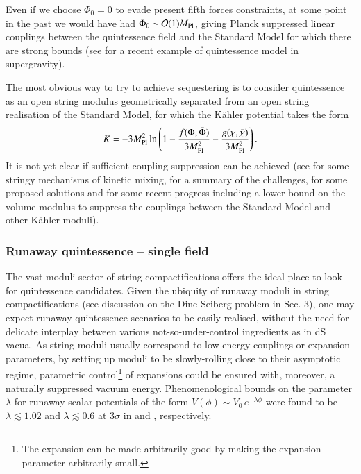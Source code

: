 \begin{itemize}
Even if we choose $\Phi_0=0$ to evade present fifth forces constraints, at some point in the past we would have had $\Phi_0 \sim \mathcal{O}(1)M_{\rm Pl}$, giving Planck suppressed linear couplings between the quintessence field and the Standard Model for which there are strong bounds (see \cite{Chiang:2018jdg} for a recent example of quintessence model in supergravity). 

The most obvious way to try to achieve sequestering is to consider quintessence as an open string modulus geometrically separated from an open string realisation of the Standard Model, for which the K\"ahler potential takes the form 
\begin{equation}
K = -3M_{\rm Pl}^2 \ln \left( 1 - \frac{f(\Phi, \bar\Phi)}{3 M_{\rm Pl}^2} - \frac{g(\chi, \bar\chi)}{3M_{\rm Pl}^2} \right).
\end{equation}
It is not yet clear if sufficient coupling suppression can be achieved (see \cite{Conlon:2007gk, Cicoli:2010ha, Cicoli:2012cy, Abel:2008ai, Burgess:2008ri, Goodsell:2009xc, Cicoli:2011yh, Gan:2023wnp} for some stringy mechanisms of kinetic mixing, \cite{Berg:2010ha} for a summary of the challenges, \cite{Aparicio:2014wxa} for some proposed solutions and \cite{Acharya:2018deu} for some recent progress including a lower bound on the volume modulus to suppress the couplings between the Standard Model and other K\"ahler moduli).  
\end{itemize}
     



\subsubsection{Runaway quintessence -- single field} 
\label{S:singlefieldq}

The vast moduli sector of string compactifications offers the ideal place to look for quintessence candidates. Given the ubiquity of runaway moduli in string compactifications (see discussion on the Dine-Seiberg problem in Sec. 3), one may expect runaway quintessence scenarios to be easily realised, without the need for delicate interplay between various not-so-under-control ingredients as in dS vacua. As string moduli usually correspond to low energy couplings or expansion parameters, by setting up moduli to be slowly-rolling close to their asymptotic regime, parametric control\footnote{The expansion can be made arbitrarily good by making the expansion parameter arbitrarily small.} of expansions could be ensured with, moreover, a naturally suppressed vacuum energy.  Phenomenological bounds on the parameter $\lambda$ for runaway scalar potentials of the form $V(\phi) \sim V_0\,e^{-\lambda\phi}$ were found to be $\lambda \lesssim 1.02$ and $\lambda \lesssim 0.6$ at 3$\sigma$ in \cite{Akrami:2018ylq} and \cite{Agrawal:2018own}, respectively.

